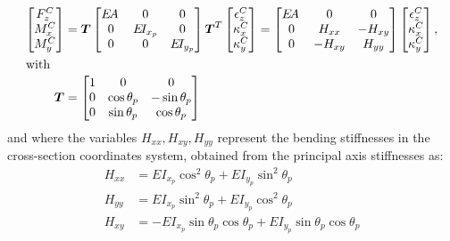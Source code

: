 \documentclass[11pt]{article}
\newcommand{\m}[1]{\boldsymbol{#1}}
\newcommand{\cent}{{C}}
\newcommand{\EA}{{E\!A}\,}
\newcommand{\EI}{E\!I}
\begin{document}
\begin{align}
    \begin{bmatrix}F_z^\cent \\ M_{x}^\cent \\ M_{y}^\cent\\ \end{bmatrix}
    &=
        \m{T}
    \begin{bmatrix}\EA & 0 & 0\\0 & \EI_{x_p} & 0\\0 & 0& \EI_{y_p}\end{bmatrix}
        \m{T}^T
    \begin{bmatrix}\epsilon_z^\cent \\ \kappa_x^\cent \\ \kappa_y^\cent\\ \end{bmatrix}
        =
    \begin{bmatrix}\EA & 0 & 0\\0 & H_{xx} & - H_{xy}\\0 & - H_{xy} & H_{yy}\end{bmatrix}
    \begin{bmatrix}\epsilon_z^\cent \\ \kappa_x^\cent \\ \kappa_y^\cent\\ \end{bmatrix}
            ,
    \label{eq:AxialBendingAtCentroid}
        \\
\shortintertext{with}
    \m{T}&=\begin{bmatrix}1 & 0 & 0\\0 & \cos\theta_p & -\sin\theta_p\\0 & \sin\theta_p& \cos\theta_p\end{bmatrix}
\end{align}
and where the variables $H_{xx},H_{xy},H_{yy}$ represent the bending stiffnesses in the cross-section coordinates system, obtained from the principal axis stiffnesses as:
\begin{align}
H_{xx} &=  \EI_{x_p} \cos^{2}\theta_p + \EI_{y_p} \sin^{2}\theta_p \\
H_{yy} &= \EI_{x_p} \sin^{2}\theta_p + \EI_{y_p} \cos^{2}{\theta_p}  \\
H_{xy} &= -\EI_{x_p} \sin\theta_p \cos\theta_p + \EI_{y_p} \sin\theta_p \cos\theta_p
\end{align}
% 
% 
\end{document}

